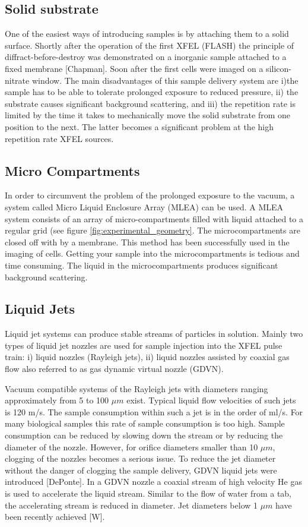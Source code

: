 \subsection{Solid substrate}
One of the easiest ways of introducing samples is by attaching them to a solid surface. Shortly after the operation of the first XFEL (FLASH) the principle of diffract-before-destroy was demonstrated on a inorganic sample attached to a fixed membrane [Chapman]. Soon after the first cells were imaged on a silicon-nitrate window. The main disadvantages of this sample delivery system are i)the sample has to be able to tolerate prolonged exposure to reduced pressure, ii) the substrate causes significant background scattering, and iii) the repetition rate is limited by the time it takes to mechanically move the solid substrate from one position to the next. The latter becomes a significant problem at the high repetition rate XFEL sources.

\subsection{Micro Compartments}
In order to circumvent the problem of the prolonged exposure to the vacuum, a system called Micro Liquid Enclosure Array (MLEA) can be used. A MLEA system consists of an array of micro-compartments filled with liquid attached to a regular grid (see figure \ref{fig:experimental_geometry}. The microcompartments are closed off with by a membrane. This method has been successfully used in the imaging of cells. Getting your sample into the microcompartments is tedious and time consuming. The liquid in the microcompartments produces significant background scattering. 

\subsection{Liquid Jets}

Liquid jet systems can produce stable streams of particles in solution. Mainly two types of liquid jet nozzles are used for sample injection into the XFEL pulse train: i) liquid nozzles (Rayleigh jets), ii) liquid nozzles assisted by coaxial gas flow also referred to as gas dynamic virtual nozzle (GDVN). 

Vacuum compatible systems of the Rayleigh jets with diameters ranging approximately from 5 to 100 $\mu m$
exist. Typical liquid flow velocities of such jets is 120 m/s. The sample consumption within such a jet is in the order of ml/s. For many biological samples this rate of sample consumption is too high. Sample consumption can be reduced by slowing down the stream or by reducing the diameter of the nozzle. However, for orifice diameters smaller than 10 $\mu m$, clogging of the nozzles becomes a serious issue. To reduce the jet diameter without the danger of clogging the sample delivery, GDVN liquid jets were introduced [DePonte]. In a GDVN nozzle a coaxial stream of high velocity He gas is used to accelerate the liquid stream. Similar to the flow of water from a tab, the accelerating stream is reduced in diameter. Jet diameters below 1 $\mu m$ have been recently achieved [W]. 

